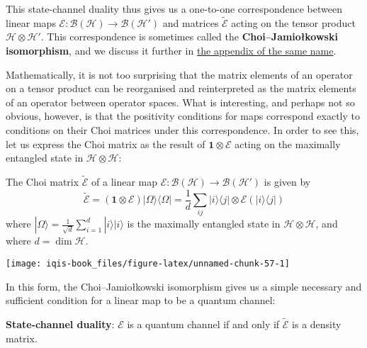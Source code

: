 \documentclass[fleqn]{article}
\newenvironment{idea}{\noindent}{\medskip}
\begin{document}
This state-channel duality thus gives us a one-to-one correspondence between linear maps \(\mathcal{E}\colon\mathcal{B}(\mathcal{H})\to\mathcal{B}(\mathcal{H}')\) and matrices \(\widetilde{\mathcal{E}}\) acting on the tensor product \(\mathcal{H}\otimes\mathcal{H}'\).
This correspondence is sometimes called the \textbf{Choi--Jamiołkowski isomorphism}, and we discuss it further in \protect\hyperlink{choi-jamiolkowski}{the appendix of the same name}.

Mathematically, it is not too surprising that the matrix elements of an operator on a tensor product can be reorganised and reinterpreted as the matrix elements of an operator between operator spaces.
What is interesting, and perhaps not so obvious, however, is that the positivity conditions for maps correspond exactly to conditions on their Choi matrices under this correspondence.
In order to see this, let us express the Choi matrix as the result of \(\mathbf{1}\otimes\mathcal{E}\) acting on the maximally entangled state in \(\mathcal{H}\otimes\mathcal{H}\):

\begin{idea}
The Choi matrix \(\widetilde{\mathcal{E}}\) of a linear map \(\mathcal{E}\colon\mathcal{B}(\mathcal{H})\to\mathcal{B}(\mathcal{H'})\) is given by
\[
  \widetilde{\mathcal{E}}
  = (\mathbf{1}\otimes\mathcal{E})|\Omega\rangle\langle\Omega|
  = \frac{1}{d} \sum_{ij} |i\rangle\langle j|\otimes\mathcal{E}(|i\rangle\langle j|)
\]
where \(|\Omega\rangle=\frac{1}{\sqrt d}\sum_{i=1}^d|i\rangle|i\rangle\) is the maximally entangled state in \(\mathcal{H}\otimes\mathcal{H}\), and where \(d=\dim\mathcal{H}\).

\end{idea}

\begin{center}\texttt{[image: iqis-book\_files/figure-latex/unnamed-chunk-57-1]} \end{center}

In this form, the Choi--Jamiołkowski isomorphism gives us a simple necessary and sufficient condition for a linear map to be a quantum channel:

\begin{idea}
\textbf{State-channel duality}: \(\mathcal{E}\) is a quantum channel if and only if \(\widetilde{\mathcal{E}}\) is a density matrix.

\end{idea}
\end{document}

